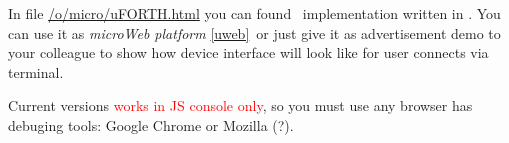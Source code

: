 \clearpage{}\secdown

In file
\href{https://github.com/ponyatov/o/raw/master/micro/uFORTH.html}{/o/micro/uFORTH.html}
you can found \uF\ implementation written in \js. You can use it as \emph{microWeb platform} \ref{uweb}\ or just give it as advertisement demo to your colleague to show how device interface will look like for user
connects via terminal.

\bigskip\noindent
Current versions \textcolor{red}{works in JS console only}, so you must use
any browser has debuging tools: Google Chrome or Mozilla (?).

\secup